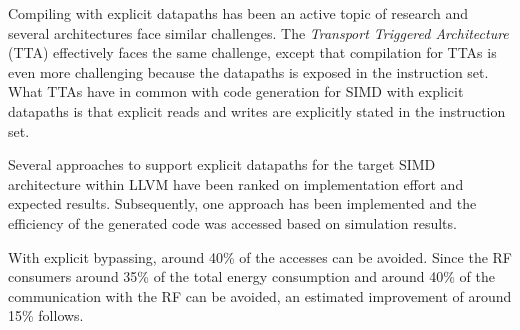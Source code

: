 Compiling with explicit datapaths has been an active topic of research and several architectures face similar challenges. The \emph{Transport Triggered Architecture} (TTA) effectively faces the same challenge, except that compilation for TTAs is even more challenging because the datapaths is exposed in the instruction set. What TTAs have in common with code generation for SIMD with explicit datapaths is that explicit reads and writes are explicitly stated in the instruction set.

Several approaches to support explicit datapaths for the target SIMD architecture within LLVM have been ranked on implementation effort and expected results. Subsequently, one approach has been implemented and the efficiency of the generated code was accessed based on simulation results. 

With explicit bypassing, around 40\% of the accesses can be avoided. Since the RF consumers around 35\% of the total energy consumption and around 40\% of the communication with the RF can be avoided, an estimated improvement of around 15\% follows.

\vspace{10mm}
 \keywords
